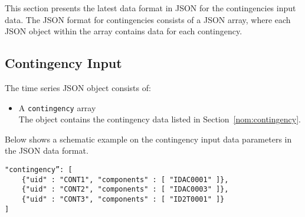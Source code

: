 \label{sec:contingency}
This section presents the latest data format in JSON for the contingencies input data.
The JSON format for contingencies consists of a JSON array,
where each JSON object within the array contains data for each contingency.

\subsection{Contingency Input}
\label{sec:input_data}
The time series JSON object consists of:
\begin{itemize}
    \item A \texttt{contingency} array\\
        The object contains the contingency data listed in Section~\ref{nom:contingency}.
\end{itemize}


Below shows a schematic example on the contingency input data parameters in the JSON data format.
\begin{verbatim}
"contingency”: [
    {"uid" : "CONT1", "components" : [ "IDAC0001" ]},
    {"uid" : "CONT2", "components" : [ "IDAC0003" ]},
    {"uid" : "CONT3", "components" : [ "ID2T0001" ]}
]
\end{verbatim}


